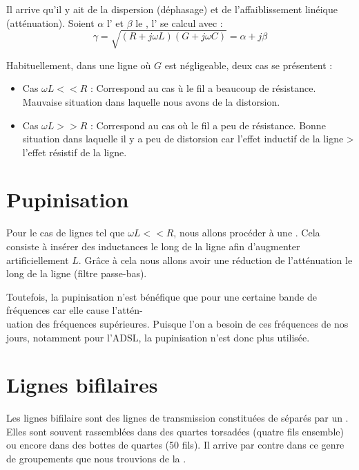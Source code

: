 Il arrive qu'il y ait de la dispersion (déphasage) et de l'affaiblissement linéique (atténuation). Soient $\alpha$ l' et $\beta$ le , l' se calcul avec :
\begin{equation*}
\gamma = \sqrt{(R + j \omega L)(G + j \omega C)} = \alpha + j \beta
\end{equation*}

Habituellement, dans une ligne où $G$ est négligeable, deux cas se présentent :
\begin{itemize}
\item Cas $\omega L << R$ : Correspond au cas ù le fil a beaucoup de résistance. Mauvaise situation dans laquelle nous avons de la distorsion.
\item Cas $\omega L >> R$ : Correspond au cas où le fil a peu de résistance. Bonne situation dans laquelle il y a peu de distorsion car l'effet inductif de la ligne > l'effet résistif de la ligne.
\end{itemize}

\section{Pupinisation}

Pour le cas de lignes tel que $\omega L << R$, nous allons procéder à une .
Cela consiste à insérer des inductances le long de la ligne afin d'augmenter artificiellement $L$.
Grâce à cela nous allons avoir une réduction de l'atténuation le long de la ligne (filtre passe-bas).

Toutefois, la pupinisation n'est bénéfique que pour une certaine bande de fréquences car elle cause l'attén-\\uation des fréquences supérieures.
Puisque l'on a besoin de ces fréquences de nos jours, notamment pour l’ADSL, la pupinisation n’est donc plus utilisée.

\section{Lignes bifilaires}

Les lignes bifilaire sont des lignes de transmission constituées de  séparés par un . Elles sont souvent rassemblées dans des quartes torsadées (quatre fils ensemble) ou encore dans des bottes de quartes (50 fils). Il arrive par contre dans ce genre de groupements que nous trouvions de la .

